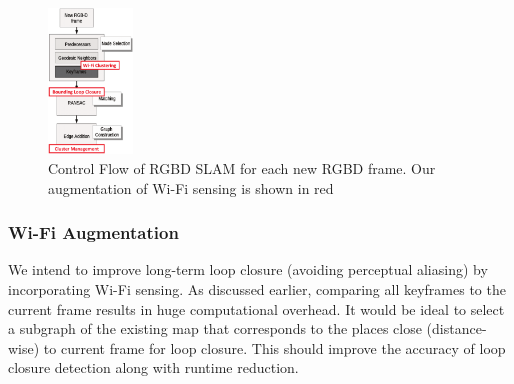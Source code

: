 \begin{figure}
\centering
\includegraphics[width=0.2\textwidth]{Figure3.eps}
\caption{Control Flow of RGBD SLAM for each new RGBD frame. Our augmentation of Wi-Fi sensing is shown in red}
\label{fig:RGBD_box}
\vspace{-15pt}
\end{figure}

\subsubsection{\textbf{Wi-Fi Augmentation}}
We intend to improve long-term loop closure (avoiding perceptual aliasing) by incorporating Wi-Fi sensing. As discussed earlier, %
comparing all keyframes to the current frame results in huge computational overhead. It would be ideal to select a subgraph of the existing map that corresponds to the places close (distance-wise) to current frame for loop closure. This should improve the accuracy of loop closure detection along with runtime reduction. %

